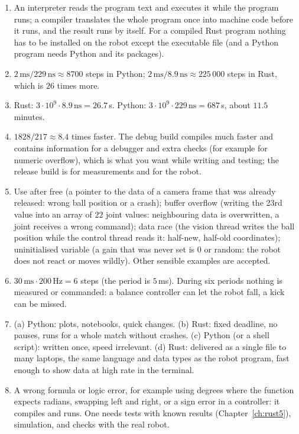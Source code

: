 \begin{enumerate}[label=\textbf{\ansnum.\arabic*}]
  \item An interpreter reads the program text and executes it while the program runs; a compiler translates the whole program once into machine code before it runs, and the result runs by itself. For a compiled Rust program nothing has to be installed on the robot except the executable file (and a Python program needs Python and its packages).
  \item $2\,\mathrm{ms}/229\,\mathrm{ns}\approx8700$ steps in Python; $2\,\mathrm{ms}/8.9\,\mathrm{ns}\approx225\,000$ steps in Rust, which is $26$ times more.
  \item Rust: $3\cdot10^9\cdot8.9\,\mathrm{ns}=26.7$\,s. Python: $3\cdot10^9\cdot229\,\mathrm{ns}=687$\,s, about $11.5$ minutes.
  \item $1828/217\approx8.4$ times faster. The debug build compiles much faster and contains information for a debugger and extra checks (for example for numeric overflow), which is what you want while writing and testing; the release build is for measurements and for the robot.
  \item Use after free (a pointer to the data of a camera frame that was already released: wrong ball position or a crash); buffer overflow (writing the 23rd value into an array of $22$ joint values: neighbouring data is overwritten, a joint receives a wrong command); data race (the vision thread writes the ball position while the control thread reads it: half-new, half-old coordinates); uninitialised variable (a gain that was never set is $0$ or random: the robot does not react or moves wildly). Other sensible examples are accepted.
  \item $30\,\mathrm{ms}\cdot200\,\mathrm{Hz}=6$ steps (the period is $5$\,ms). During six periods nothing is measured or commanded: a balance controller can let the robot fall, a kick can be missed.
  \item (a) Python: plots, notebooks, quick changes. (b) Rust: fixed deadline, no pauses, runs for a whole match without crashes. (c) Python (or a shell script): written once, speed irrelevant. (d) Rust: delivered as a single file to many laptops, the same language and data types as the robot program, fast enough to show data at high rate in the terminal.
  \item A wrong formula or logic error, for example using degrees where the function expects radians, swapping left and right, or a sign error in a controller: it compiles and runs. One needs tests with known results (Chapter~\ref{ch:rust5}), simulation, and checks with the real robot.

\end{enumerate}
